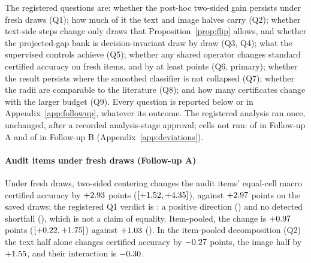 The registered questions are: whether the post-hoc two-sided gain persists
under fresh draws (Q1); how much of it the text and image halves carry (Q2);
whether text-side steps change only draws that Proposition~\ref{prop:flip}
allows, and whether the projected-gap bank is decision-invariant draw by draw
(Q3, Q4); what the supervised controls achieve (Q5); whether any shared
operator changes standard certified accuracy on fresh items, and by at least
\FUSESOI{} points (Q6, primary); whether the result persists where the
smoothed classifier is not collapsed (Q7); whether the radii are comparable to
the literature (Q8); and how many certificates change with the larger budget
(Q9). Every question is reported below or in Appendix~\ref{app:followup},
whatever its outcome. The registered analysis ran once, unchanged, after a
recorded analysis-stage approval; cells not run: \FUNotRunA{} of \FUCellsA{} in
Follow-up A and \FUNotRunB{} of \FUCellsB{} in Follow-up B
(Appendix~\ref{app:deviations}).



\paragraph{Audit items under fresh draws (Follow-up A)}
Under fresh draws, two-sided centering changes the audit items' equal-cell
macro certified accuracy by $+2.93$ points
($[+1.52,+4.35]$), against $+2.97$ points on the saved
draws; the registered Q1 verdict is \emph{\FUQOneVerdict}: a positive
direction (\FUQOnePDirection) and no detected shortfall (\FUQOnePShortfall),
which is not a claim of equality. Item-pooled, the change is
$+0.97$ points ($[+0.22,+1.75]$)
against $+1.03$ (\FUQOnePooledVerdict). In the item-pooled
decomposition (Q2) the text half alone changes certified accuracy by
$-0.27$ points, the image half by $+1.55$, and their
interaction is $-0.30$.


